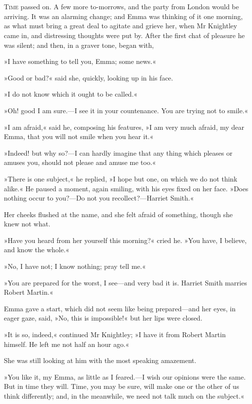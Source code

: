 \chapter[Chapter \thechapter]{}
\lettrine[lines=4,lraise=0.3]{T}{ime} passed on. A few more to-morrows, and the party from London would be arriving. It was an alarming change; and Emma was thinking of it one morning, as what must bring a great deal to agitate and grieve her, when Mr Knightley came in, and distressing thoughts were put by. After the first chat of pleasure he was silent; and then, in a graver tone, began with,

»I have something to tell you, Emma; some news.«

»Good or bad?« said she, quickly, looking up in his face.

»I do not know which it ought to be called.«

»Oh! good I am sure.—I see it in your countenance. You are trying not to smile.«

»I am afraid,« said he, composing his features, »I am very much afraid, my dear Emma, that you will not smile when you hear it.«

»Indeed! but why so?—I can hardly imagine that any thing which pleases or amuses you, should not please and amuse me too.«

»There is one subject,« he replied, »I hope but one, on which we do not think alike.« He paused a moment, again smiling, with his eyes fixed on her face. »Does nothing occur to you?—Do not you recollect?—Harriet Smith.«

Her cheeks flushed at the name, and she felt afraid of something, though she knew not what.

»Have you heard from her yourself this morning?« cried he. »You have, I believe, and know the whole.«

»No, I have not; I know nothing; pray tell me.«

»You are prepared for the worst, I see—and very bad it is. Harriet Smith marries Robert Martin.«

Emma gave a start, which did not seem like being prepared—and her eyes, in eager gaze, said, »No, this is impossible!« but her lips were closed.

»It is so, indeed,« continued Mr Knightley; »I have it from Robert Martin himself. He left me not half an hour ago.«

She was still looking at him with the most speaking amazement.

»You like it, my Emma, as little as I feared.—I wish our opinions were the same. But in time they will. Time, you may be sure, will make one or the other of us think differently; and, in the meanwhile, we need not talk much on the subject.«

